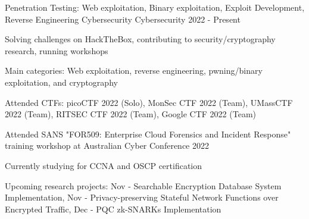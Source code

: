 \begin{cventries}
  \cventry
    {Penetration Testing: Web exploitation, Binary exploitation, Exploit Development, Reverse Engineering}
    {Cybersecurity}
    {Cybersecurity}
    {2022 - Present}
    {
      \begin{cvitems}
        \item{Solving challenges on HackTheBox, contributing to security/cryptography research, running workshops}
        \item{Main categories: Web exploitation, reverse engineering, pwning/binary exploitation, and cryptography}
        \item{Attended CTFs: picoCTF 2022 (Solo), MonSec CTF 2022 (Team), UMassCTF 2022 (Team), RITSEC CTF 2022 (Team), Google CTF 2022 (Team)}
        \item{Attended SANS "FOR509: Enterprise Cloud Forensics and Incident Response" training workshop at Australian Cyber Conference 2022}
        \item{Currently studying for CCNA and OSCP certification}
        \item{Upcoming research projects: Nov - Searchable Encryption Database System Implementation, Nov - Privacy-preserving Stateful Network Functions over Encrypted Traffic, Dec - PQC zk-SNARKs Implementation}
      \end{cvitems}
    }

\end{cventries}
